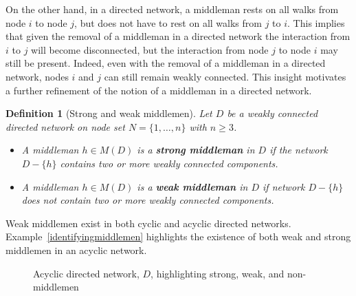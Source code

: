 \documentclass[11pt,fleqn]{article}
\newtheorem{definition}[theorem]{Definition}
\begin{document}
On the other hand, in a directed network, a middleman rests on all walks from node $i$ to node $j$, but does not have to rest on all walks from $j$ to $i$. This implies that given the removal of a middleman in a directed network the interaction from $i$ to $j$ will become disconnected, but the interaction from node $j$ to node $i$ may still be present. Indeed, even with the removal of a middleman in a directed network, nodes $i$ and $j$ can still remain weakly connected. This insight motivates a further refinement of the notion of a middleman in a directed network.

\begin{definition}[Strong and weak middlemen] \label{strongweakmiddlemen}
Let $D$ be a weakly connected directed network on node set $N = \{ 1, \ldots ,n \}$ with $n \geqslant 3$.
\begin{itemize}
\item A middleman $h \in M(D)$ is a \textbf{strong middleman} in $D$ if the network $D - \{h\}$ contains two or more weakly connected components.

\item A middleman $h \in M(D)$ is a \textbf{weak middleman} in $D$ if network $D - \{h\}$ does not contain two or more weakly connected components.
\end{itemize}
\end{definition}

Weak middlemen exist in both cyclic and acyclic directed networks. Example~\ref{identifyingmiddlemen} highlights the existence of both weak and strong middlemen in an acyclic network.

\begin{figure}[t]
\begin{center}
\end{center}
\caption[Acyclic directed network highlighting strong, weak, and non-middlemen]{Acyclic directed network, $D$, highlighting strong, weak, and non-middlemen}
\label{weakmm}
\end{figure}
\end{document}
